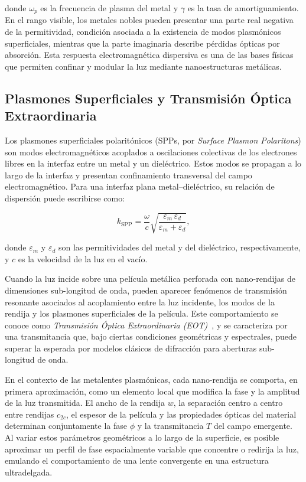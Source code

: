 \noindent donde $\omega_p$ es la frecuencia de plasma del metal y $\gamma$ es la tasa de amortiguamiento. En el rango visible, los metales nobles pueden presentar una parte real negativa de la permitividad, condición asociada a la existencia de modos plasmónicos superficiales, mientras que la parte imaginaria describe pérdidas ópticas por absorción. Esta respuesta electromagnética dispersiva es una de las bases físicas que permiten confinar y modular la luz mediante nanoestructuras metálicas.

\subsection{Plasmones Superficiales y Transmisión Óptica Extraordinaria}\label{subsec:plasmones}

Los plasmones superficiales polaritónicos (SPPs, por \textit{Surface Plasmon Polaritons}) son modos electromagnéticos acoplados a oscilaciones colectivas de los electrones libres en la interfaz entre un metal y un dieléctrico. Estos modos se propagan a lo largo de la interfaz y presentan confinamiento transversal del campo electromagnético. Para una interfaz plana metal--dieléctrico, su relación de dispersión puede escribirse como:

\begin{equation}
    k_{\text{SPP}} = \frac{\omega}{c} \sqrt{\frac{\varepsilon_m \, \varepsilon_d}{\varepsilon_m + \varepsilon_d}},
    \label{eq:spp_dispersion}
\end{equation}

\noindent donde $\varepsilon_m$ y $\varepsilon_d$ son las permitividades del metal y del dieléctrico, respectivamente, y $c$ es la velocidad de la luz en el vacío.

Cuando la luz incide sobre una película metálica perforada con nano-rendijas de dimensiones sub-longitud de onda, pueden aparecer fenómenos de transmisión resonante asociados al acoplamiento entre la luz incidente, los modos de la rendija y los plasmones superficiales de la película. Este comportamiento se conoce como \textit{Transmisión Óptica Extraordinaria (EOT)}~\cite{ebbesen1998eot}, y se caracteriza por una transmitancia que, bajo ciertas condiciones geométricas y espectrales, puede superar la esperada por modelos clásicos de difracción para aberturas sub-longitud de onda.


En el contexto de las metalentes plasmónicas, cada nano-rendija se comporta, en primera aproximación, como un elemento local que modifica la fase y la amplitud de la luz transmitida. El ancho de la rendija $w$, la separación centro a centro entre rendijas $c_{2c}$, el espesor de la película y las propiedades ópticas del material determinan conjuntamente la fase $\phi$ y la transmitancia $T$ del campo emergente. Al variar estos parámetros geométricos a lo largo de la superficie, es posible aproximar un perfil de fase espacialmente variable que concentre o redirija la luz, emulando el comportamiento de una lente convergente en una estructura ultradelgada.

